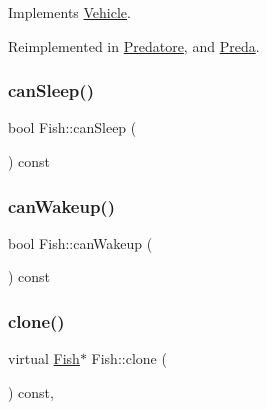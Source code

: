 Implements \hyperlink{classVehicle_a7b8b7578202a306a4dc08d587dc70f17_a7b8b7578202a306a4dc08d587dc70f17}{Vehicle}.



Reimplemented in \hyperlink{classPredatore_adc1dc0f0cdd41923d87dc23b4fc550a7_adc1dc0f0cdd41923d87dc23b4fc550a7}{Predatore}, and \hyperlink{classPreda_a5c0724c3854a2fff92f3c2308514c89e_a5c0724c3854a2fff92f3c2308514c89e}{Preda}.

\mbox{\label{classFish_a9a94edb09498e8d0d2381c2cc3e2e9dc_a9a94edb09498e8d0d2381c2cc3e2e9dc}} 
\subsubsection{\texorpdfstring{can\+Sleep()}{canSleep()}}
{\footnotesize\ttfamily bool Fish\+::can\+Sleep (\begin{DoxyParamCaption}{ }\end{DoxyParamCaption}) const\hspace{0.3cm}{\ttfamily [virtual]}}

\mbox{\label{classFish_a033298bf0dc885b82dbd195fc4997643_a033298bf0dc885b82dbd195fc4997643}} 
\subsubsection{\texorpdfstring{can\+Wakeup()}{canWakeup()}}
{\footnotesize\ttfamily bool Fish\+::can\+Wakeup (\begin{DoxyParamCaption}{ }\end{DoxyParamCaption}) const\hspace{0.3cm}{\ttfamily [virtual]}}

\mbox{\label{classFish_a6732945f7373a28b1723e55de8a65e13_a6732945f7373a28b1723e55de8a65e13}} 
\subsubsection{\texorpdfstring{clone()}{clone()}}
{\footnotesize\ttfamily virtual \hyperlink{classFish}{Fish}$\ast$ Fish\+::clone (\begin{DoxyParamCaption}{ }\end{DoxyParamCaption}) const\hspace{0.3cm}{\ttfamily [override]}, {}}



